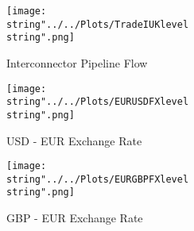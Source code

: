 \begin{figure}[ht]
  \centering
\texttt{[image: \\string"../../Plots/TradeIUKlevel\\string".png]}
  \caption{Interconnector Pipeline Flow}\label{fig:TradeIUKlevel}
\end{figure}

\begin{figure}[ht]
  \centering
\texttt{[image: \\string"../../Plots/EURUSDFXlevel\\string".png]}
  \caption{USD - EUR Exchange Rate}\label{fig:EURUSDFXlevel}
\end{figure}

\begin{figure}[ht]
  \centering
\texttt{[image: \\string"../../Plots/EURGBPFXlevel\\string".png]}
  \caption{GBP - EUR Exchange Rate}\label{fig:EURGBPFXlevel}
\end{figure}

\FloatBarrier